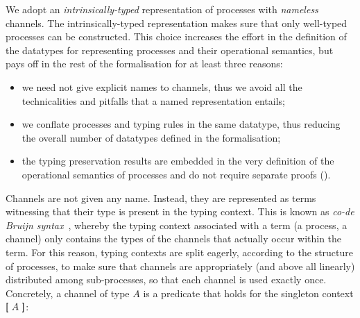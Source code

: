 We adopt an \emph{intrinsically-typed} representation of processes with
\emph{nameless} channels. The intrinsically-typed representation makes sure that
only well-typed processes can be constructed. This choice increases the effort
in the definition of the datatypes for representing processes and their
operational semantics, but pays off in the rest of the formalisation for at
least three reasons:
\begin{itemize}
\item we need not give explicit names to channels, thus we avoid all the
  technicalities and pitfalls that a named representation entails;
\item we conflate processes and typing rules in the same datatype, thus reducing
  the overall number of datatypes defined in the formalisation;
\item the typing preservation results are embedded in the very definition of the
  operational semantics of processes and do not require separate proofs
  ().
\end{itemize}

Channels are not given any name. Instead, they are represented as terms
witnessing that their type is present in the typing context. This is known as
\emph{co-de Bruijn syntax}~\cite{McBride18}, whereby the typing context
associated with a term (a process, a channel) only contains the types of the
channels that actually occur within the term. For this reason, typing contexts
are split eagerly, according to the structure of processes, to make sure that
channels are appropriately (and above all linearly) distributed among
sub-processes, so that each channel is used exactly once.
%
Concretely, a channel of type $A$ is a predicate that holds for the singleton
context $\AgdaFunction[~A~\AgdaFunction]$:

\begin{code}%
\>[0]\AgdaSpace{}%
\AgdaSpace{}%
\AgdaSymbol{(}\AgdaSpace{}%
\AgdaSymbol{:}\AgdaSpace{}%
\AgdaSymbol{)}\AgdaSpace{}%
\AgdaSymbol{:}\AgdaSpace{}%
\AgdaSpace{}%
\AgdaSpace{}%
\AgdaSpace{}%
\<%
\\
\>[0][@{}l@{\AgdaIndent{0}}]%
\>[2]\AgdaSpace{}%
\AgdaSymbol{:}\AgdaSpace{}%
\AgdaSpace{}%
\AgdaSpace{}%
\AgdaOperator{\AgdaFunction{[}}\AgdaSpace{}%
\AgdaSpace{}%
\AgdaOperator{\AgdaFunction{]}}\<%
\end{code}

